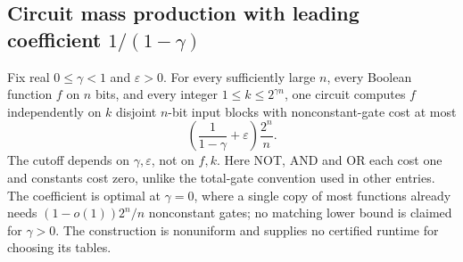 \begin{result}
\end{result}

\begin{result}
\subsection{Circuit mass production with leading coefficient $1/(1-\gamma)$}
Fix real $0\le\gamma<1$ and $\varepsilon>0$. For every sufficiently large $n$,
every Boolean function $f$ on $n$ bits, and every integer $1\le k\le2^{\gamma n}$,
one circuit computes $f$ independently on $k$ disjoint $n$-bit input blocks with
nonconstant-gate cost at most
\[
\left(\frac{1}{1-\gamma}+\varepsilon\right)\frac{2^n}{n}.
\]
The cutoff depends on $\gamma,\varepsilon$, not on $f,k$. Here NOT, AND and OR
each cost one and constants cost zero, unlike the total-gate convention used in
other entries. The coefficient is optimal at $\gamma=0$, where a single copy of
most functions already needs $(1-o(1))2^n/n$ nonconstant gates\citep{Shannon1949}\citep[Theorem 1.14]{Jukna2012};
no matching lower bound is claimed for $\gamma>0$. The construction is nonuniform and supplies no
certified runtime for choosing its tables.\citep{Schlesinger2026MassProduction}
\end{result}

